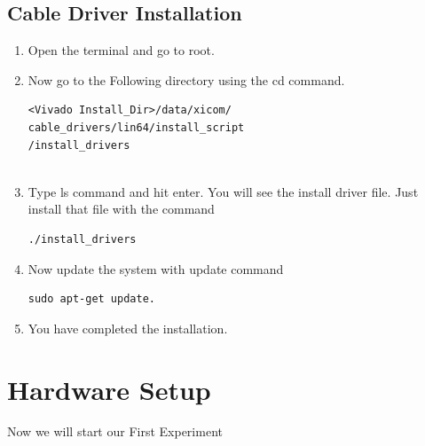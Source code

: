 \documentclass[journal,12pt,twocolumn]{IEEEtran}
\begin{document}
\subsection{Cable Driver Installation}
\begin{enumerate}

\item Open the terminal and go to root.
\item Now go to the Following directory using the cd command.
    
\begin{verbatim}
<Vivado Install_Dir>/data/xicom/
cable_drivers/lin64/install_script
/install_drivers
        
\end{verbatim}

\item Type ls command and hit enter. You will see the install driver file. Just install that file with the command

\begin{verbatim}
./install_drivers

\end{verbatim}

\item Now update the system with update command
\begin{verbatim}
sudo apt-get update.

\end{verbatim}

\item You have  completed the installation.
\end{enumerate}



%
\section{Hardware Setup}
Now we will start our First Experiment
\end{document}
